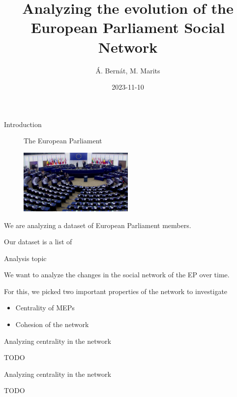 \documentclass{beamer}
\title{Analyzing the evolution of the European Parliament Social Network}
\date{2023-11-10}
\author{Á. Bernát, M. Marits}
\begin{document}
\begin{frame}[plain]
    \maketitle
\end{frame}

\begin{frame}{Introduction}
	
	\begin{figure}
		The European Parliament
	
		\includegraphics[width=0.5\textwidth]{img/euparl.jpg}
	\end{figure}

	We are analyzing a dataset of European Parliament members.
	
	\vspace{2mm}
	
	Our dataset is a list of 

	
\end{frame}

\begin{frame}{Analysis topic}
	
	We want to analyze the changes in the social network of the EP over time.
	
	\vspace{2mm}
	
	\pause For this, we picked two important properties of the network to investigate\begin{itemize}
		\pause \item Centrality of MEPs
		
		\pause \item Cohesion of the network
	\end{itemize}
	
\end{frame}

\begin{frame}{Analyzing centrality in the network}
	
	TODO
	
\end{frame}

\begin{frame}{Analyzing centrality in the network}
	
	TODO
	
\end{frame}
\end{document}
